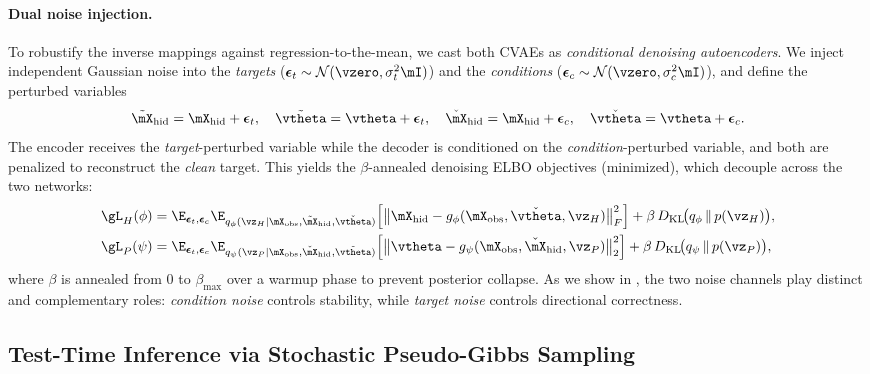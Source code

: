 \paragraph{Dual noise injection.}
To robustify the inverse mappings against regression-to-the-mean, we cast both CVAEs as
\textit{conditional denoising autoencoders}. We inject independent Gaussian noise into the
\textit{targets} ($\boldsymbol{\epsilon}_t \sim \mathcal{N}(\vzero, \sigma_t^2 \mI)$) and the
\textit{conditions} ($\boldsymbol{\epsilon}_c \sim \mathcal{N}(\vzero, \sigma_c^2 \mI)$), and define
the perturbed variables
\begin{equation}
    \tilde{\mX}_{\mathrm{hid}} = \mX_{\mathrm{hid}} + \boldsymbol{\epsilon}_t, \quad
    \tilde{\vtheta} = \vtheta + \boldsymbol{\epsilon}_t, \quad
    \check{\mX}_{\mathrm{hid}} = \mX_{\mathrm{hid}} + \boldsymbol{\epsilon}_c, \quad
    \check{\vtheta} = \vtheta + \boldsymbol{\epsilon}_c .
\end{equation}
The encoder receives the \emph{target}-perturbed variable while the decoder is conditioned on the
\emph{condition}-perturbed variable, and both are penalized to reconstruct the \emph{clean} target.
This yields the $\beta$-annealed denoising ELBO objectives (minimized), which decouple across the
two networks:
\begin{align}
\label{eqn:loss_H}
\gL_H(\phi) &= \E_{\boldsymbol{\epsilon}_t, \boldsymbol{\epsilon}_c}
    \E_{q_\phi(\vz_H \mid \mX_{\mathrm{obs}}, \tilde{\mX}_{\mathrm{hid}}, \check{\vtheta})}
    \Big[ \big\| \mX_{\mathrm{hid}} - g_\phi(\mX_{\mathrm{obs}}, \check{\vtheta}, \vz_H) \big\|_F^2 \Big]
    + \beta\, D_{\mathrm{KL}}\!\big( q_\phi \,\|\, p(\vz_H) \big), \\
\label{eqn:loss_P}
\gL_P(\psi) &= \E_{\boldsymbol{\epsilon}_t, \boldsymbol{\epsilon}_c}
    \E_{q_\psi(\vz_P \mid \mX_{\mathrm{obs}}, \check{\mX}_{\mathrm{hid}}, \tilde{\vtheta})}
    \Big[ \big\| \vtheta - g_\psi(\mX_{\mathrm{obs}}, \check{\mX}_{\mathrm{hid}}, \vz_P) \big\|_2^2 \Big]
    + \beta\, D_{\mathrm{KL}}\!\big( q_\psi \,\|\, p(\vz_P) \big),
\end{align}
where $\beta$ is annealed from $0$ to $\beta_{\max}$ over a warmup phase to prevent posterior
collapse. As we show in , the two noise channels play distinct and
complementary roles: \emph{condition noise} controls stability, while \emph{target noise} controls
directional correctness.

\subsection{Test-Time Inference via Stochastic Pseudo-Gibbs Sampling}
\label{subsec:inference}

